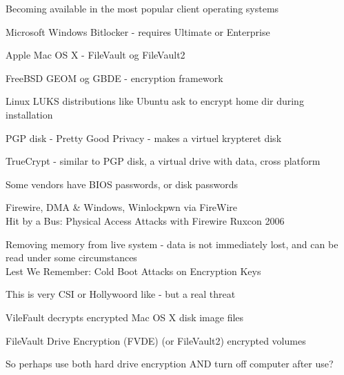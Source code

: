 \documentclass[20pt,landscape,a4paper,footrule]{foils}
\begin{document}


\begin{list1}
\item Becoming available in the most popular client operating systems
\begin{list2}
\item Microsoft Windows Bitlocker - requires Ultimate or Enterprise
\item Apple Mac OS X - FileVault og FileVault2
\item FreeBSD GEOM og GBDE - encryption framework
\item Linux LUKS distributions like Ubuntu ask to encrypt home dir during installation
\item PGP disk - Pretty Good Privacy - makes a virtuel krypteret disk
\item TrueCrypt - similar to PGP disk, a virtual drive with data, cross platform
\item Some vendors have BIOS passwords, or disk passwords
\end{list2}
\end{list1}




\begin{list1}
\item Firewire, DMA \& Windows, Winlockpwn via FireWire\\
Hit by a Bus: Physical Access Attacks with Firewire Ruxcon 2006
\vskip 5mm
\item Removing memory from live system - data is not immediately lost, and can be read under some circumstances\\
Lest We Remember: Cold Boot Attacks on Encryption Keys\\
\item This is very CSI or Hollywoord like - but a real threat
\item VileFault decrypts encrypted Mac OS X disk image files\\ 

\item  FileVault Drive Encryption (FVDE) (or FileVault2) encrypted volumes\\
\end{list1}

\centerline{So perhaps use both hard drive encryption AND turn off computer after use?}
\end{document}
